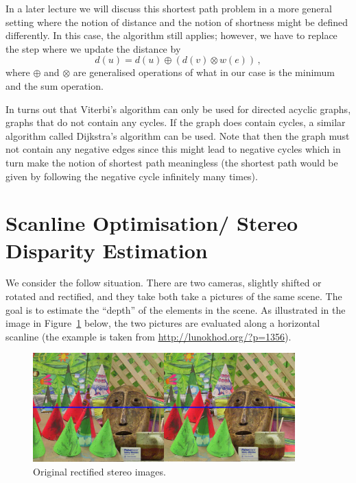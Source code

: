 In a later lecture we will discuss this shortest path problem in a more general
setting where the notion of distance and the notion of shortness might be
defined differently. In this case, the algorithm still applies; however, we have
to replace the step where we update the distance by
\begin{equation*}
  d(u) = d(u) \oplus \left( d(v) \otimes w(e) \right)\,,
\end{equation*}
where $\oplus$ and $\otimes$ are generalised operations of what in our case is
the minimum and the sum operation.

In turns out that Viterbi's algorithm can only be used for directed acyclic
graphs, \ie graphs that do not contain any cycles. If the graph does contain
cycles, a similar algorithm called Dijkstra's algorithm can be used. Note that
then the graph must not contain any negative edges since this might lead to
negative cycles which in turn make the notion of shortest path meaningless (the
shortest path would be given by following the negative cycle infinitely many
times).

\section{Scanline Optimisation/ Stereo Disparity Estimation}%
\label{sec:scanline}
We consider the follow situation. There are two cameras, slightly shifted or
rotated and rectified, and they take both take a pictures of the same scene. The
goal is to estimate the ``depth'' of the elements in the scene. As illustrated
in the image in Figure~\ref{fig:stereo_image} below, the two pictures are
evaluated along a horizontal scanline (the example is taken from
\url{http://lunokhod.org/?p=1356}).

\begin{figure}[htpb]
  \centering
  \includegraphics[width=0.9\textwidth]{Figures/input_imagery_and_scanline}
  \caption{Original rectified stereo images.}%
  \label{fig:stereo_image}
\end{figure}

